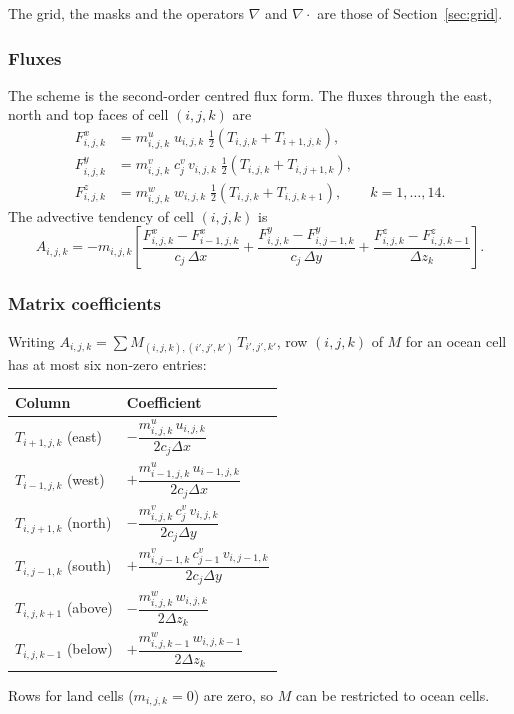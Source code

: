 \documentclass{article}
\begin{document}
The grid, the masks and the operators $\nabla$ and $\nabla\cdot$ are those of Section~\ref{sec:grid}.

\subsubsection*{Fluxes}
The scheme is the second-order centred flux form.
The fluxes through the east, north and top faces of cell $(i,j,k)$ are
\begin{align*}
F^x_{i,j,k} &= m^u_{i,j,k}\; u_{i,j,k}\; \tfrac12\left( T_{i,j,k} + T_{i+1,j,k} \right), \\
F^y_{i,j,k} &= m^v_{i,j,k}\; c^v_j\, v_{i,j,k}\; \tfrac12\left( T_{i,j,k} + T_{i,j+1,k} \right), \\
F^z_{i,j,k} &= m^w_{i,j,k}\; w_{i,j,k}\; \tfrac12\left( T_{i,j,k} + T_{i,j,k+1} \right), \qquad k = 1,\dots,14.
\end{align*}
The advective tendency of cell $(i,j,k)$ is
\begin{equation}
A_{i,j,k} = -m_{i,j,k} \left[
\frac{F^x_{i,j,k} - F^x_{i-1,j,k}}{c_j\, \Delta x}
+ \frac{F^y_{i,j,k} - F^y_{i,j-1,k}}{c_j\, \Delta y}
+ \frac{F^z_{i,j,k} - F^z_{i,j,k-1}}{\Delta z_k}
\right].
\label{eq:adv_discrete}
\end{equation}

\subsubsection*{Matrix coefficients}
Writing $A_{i,j,k} = \sum M_{(i,j,k),(i',j',k')}\, T_{i',j',k'}$, row $(i,j,k)$ of $M$ for an ocean cell has at most six non-zero entries:
\begin{center}
\begin{tabular}{ll}
\hline
Column & Coefficient \\
\hline
$T_{i+1,j,k}$ (east) & $-\dfrac{m^u_{i,j,k}\, u_{i,j,k}}{2 c_j \Delta x}$ \\[2ex]
$T_{i-1,j,k}$ (west) & $+\dfrac{m^u_{i-1,j,k}\, u_{i-1,j,k}}{2 c_j \Delta x}$ \\[2ex]
$T_{i,j+1,k}$ (north) & $-\dfrac{m^v_{i,j,k}\, c^v_j\, v_{i,j,k}}{2 c_j \Delta y}$ \\[2ex]
$T_{i,j-1,k}$ (south) & $+\dfrac{m^v_{i,j-1,k}\, c^v_{j-1}\, v_{i,j-1,k}}{2 c_j \Delta y}$ \\[2ex]
$T_{i,j,k+1}$ (above) & $-\dfrac{m^w_{i,j,k}\, w_{i,j,k}}{2 \Delta z_k}$ \\[2ex]
$T_{i,j,k-1}$ (below) & $+\dfrac{m^w_{i,j,k-1}\, w_{i,j,k-1}}{2 \Delta z_k}$ \\[1ex]
\hline
\end{tabular}
\end{center}
Rows for land cells ($m_{i,j,k} = 0$) are zero, so $M$ can be restricted to ocean cells.
\end{document}
